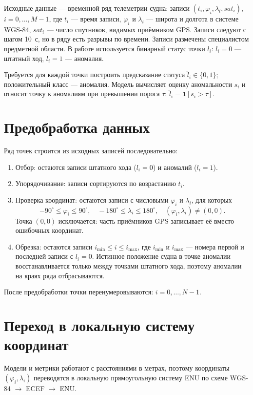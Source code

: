\documentclass[a4paper,12pt]{report}
\begin{document}
	Исходные данные --- временной ряд телеметрии судна: записи $(t_i,\varphi_i,\lambda_i,\mathit{sat}_i)$, $i=0,\ldots,M-1$, где $t_i$ --- время записи, $\varphi_i$ и $\lambda_i$ --- широта и долгота в системе WGS-84, $\mathit{sat}_i$ --- число спутников, видимых приёмником GPS.
	Записи следуют с шагом 10~с, но в ряду есть разрывы по времени.
	Записи размечены специалистом предметной области. В работе используется бинарный статус точки $l_i$: $l_i=0$ --- штатный ход, $l_i=1$ --- аномалия.

	Требуется для каждой точки построить предсказание статуса $\hat l_i\in\{0,1\}$; положительный класс --- аномалия.
	Модель вычисляет оценку аномальности $s_i$ и относит точку к аномалиям при превышении порога $\tau$: $\hat l_i=\mathbf 1[s_i>\tau]$.

	\section{Предобработка данных}

	Ряд точек строится из исходных записей последовательно:
	\begin{enumerate}
		\item Отбор: остаются записи штатного хода ($l_i=0$) и аномалий ($l_i=1$).
		\item Упорядочивание: записи сортируются по возрастанию $t_i$.
		\item Проверка координат: остаются записи с числовыми $\varphi_i$ и $\lambda_i$, для которых
		\[
			-90^\circ\le\varphi_i\le 90^\circ,\quad -180^\circ\le\lambda_i\le 180^\circ,\quad (\varphi_i,\lambda_i)\neq(0,0).
		\]
		Точка $(0,0)$ исключается: часть приёмников GPS записывает её вместо ошибочных координат.
		\item Обрезка: остаются записи $i_{\min}\le i\le i_{\max}$, где $i_{\min}$ и $i_{\max}$ --- номера первой и последней записи с $l_i=0$.
		Истинное положение судна в точке аномалии восстанавливается только между точками штатного хода, поэтому аномалии на краях ряда отбрасываются.
	\end{enumerate}
	После предобработки точки перенумеровываются: $i=0,\ldots,N-1$.

	\section{Переход в локальную систему координат}

	Модели и метрики работают с расстояниями в метрах, поэтому координаты $(\varphi_i,\lambda_i)$ переводятся в локальную прямоугольную систему ENU по схеме WGS-84 $\to$ ECEF $\to$ ENU.
\end{document}
